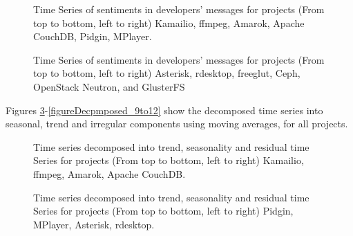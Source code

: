 \documentclass[12pt]{report}
\begin{document}
\begin{figure}[!htbp]
\caption{Time Series of sentiments in developers' messages for projects (From top to bottom, left to right) Kamailio, ffmpeg, Amarok, Apache CouchDB, Pidgin, MPlayer.}
\label{figureTS_1to6}
\end{figure}


\begin{figure}[!htbp]
\caption{Time Series of sentiments in developers' messages for projects (From top to bottom, left to right) Asterisk, rdesktop, freeglut, Ceph, OpenStack Neutron, and GlusterFS}
\label{figureTS_7to12}
\end{figure}

Figures \ref{figureDecpmposed_1to4}-\ref{figureDecpmposed_9to12} show the decomposed time series into seasonal, trend and irregular components using moving averages, for all projects. 

\begin{figure}[!htbp]
\caption{Time series decomposed into trend, seasonality and residual time Series for projects (From top to bottom, left to right) Kamailio, ffmpeg, Amarok, Apache CouchDB.}
\label{figureDecpmposed_1to4}
\end{figure}

\begin{figure}[!htbp]
\caption{Time series decomposed into trend, seasonality and residual time Series for projects (From top to bottom, left to right) Pidgin, MPlayer, Asterisk, rdesktop.}
\label{figureDecpmposed_5to8}
\end{figure}
\end{document}
